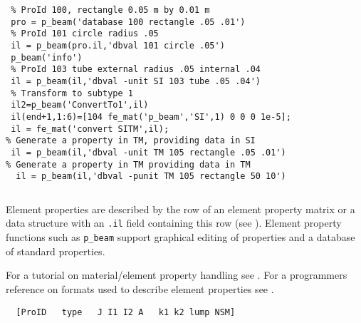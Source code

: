 \begin{verbatim}
 % ProId 100, rectangle 0.05 m by 0.01 m
 pro = p_beam('database 100 rectangle .05 .01')
 % ProId 101 circle radius .05
 il = p_beam(pro.il,'dbval 101 circle .05')
 p_beam('info')
 % ProId 103 tube external radius .05 internal .04
 il = p_beam(il,'dbval -unit SI 103 tube .05 .04')
 % Transform to subtype 1
 il2=p_beam('ConvertTo1',il)
 il(end+1,1:6)=[104 fe_mat('p_beam','SI',1) 0 0 0 1e-5];
 il = fe_mat('convert SITM',il);
% Generate a property in TM, providing data in SI
 il = p_beam(il,'dbval -unit TM 105 rectangle .05 .01')
% Generate a property in TM providing data in TM
  il = p_beam(il,'dbval -punit TM 105 rectangle 50 10')
\end{verbatim}%


\begin{verbatim}

\end{verbatim}%




Element properties are described by the row of an element property matrix or a data structure with an {\tt .il} field containing this row (see ). Element property functions such as {\tt p\_beam} support graphical editing of properties and a database of standard properties. 

For a tutorial on material/element property handling see . For a programmers reference on formats used to describe element properties see . 



\begin{verbatim}
  [ProID   type   J I1 I2 A   k1 k2 lump NSM]
\end{verbatim}


